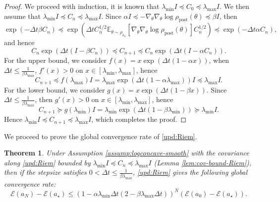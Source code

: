 \documentclass[11pt]{article}
\theoremstyle{plain}
\newtheorem{theorem}{Theorem}[section]
\theoremstyle{definition}
\theoremstyle{remark}
\begin{document}
\begin{proof}
    We proceed with induction, it is known that $\lambda_{\min} I \preceq C_0 \preceq \lambda_{\max} I$. We then assume that $\lambda_{\min} I \preceq C_n \preceq \lambda_{\max} I$.
    Since $\alpha I \preceq -\nabla_\theta \nabla_\theta \log \rho_\mathrm{post} (\theta) \preceq \beta I$, then
    \begin{equation*}
        \exp \left( -\Delta t \beta C_n \right) \preceq \exp \left( \Delta t C_n^{1/2} \mathbb{E}_{\theta\sim \rho_{a_n}} [\nabla_\theta \nabla_\theta \log \rho_\mathrm{post}(\theta)] C_n^{1/2}\right) \preceq \exp \left( -\Delta t \alpha C_n \right),
    \end{equation*}
    and hence
    \begin{equation*}
        C_n \exp \left( \Delta t (I - \beta C_n ) \right) \preceq C_{n+1} \preceq  C_n \exp \left( \Delta t ( I - \alpha C_n) \right).
    \end{equation*}
    For the upper bound, we consider $f(x) = x \exp (\Delta t (1 - \alpha x))$, when $\Delta t \leq \frac{1}{\beta \lambda_{\max}}$, $f'(x) > 0$ on $x \in [\lambda_{\min}, \lambda_{\max}]$, hence
    \begin{equation*}
        C_{n+1} \preceq f(\lambda_{\max}) I = \lambda_{\max} \exp \left(\Delta t (1 - \alpha \lambda_{\max})\right) I \preceq \lambda_{\max} I.
    \end{equation*}
    For the lower bound, we consider $g(x) = x \exp (\Delta t (1 - \beta x))$. Since $\Delta t \leq \frac{1}{\beta \lambda_{\max}}$, then $g'(x) > 0$ on $x \in [\lambda_{\min}, \lambda_{\max}]$, hence
    \begin{equation*}
        C_{n+1} \succeq g(\lambda_{\min}) I = \lambda_{\min} \exp \left( \Delta t (1 - \beta \lambda_{\min}) \right) \succeq \lambda_{\min} I.
    \end{equation*}
    Hence $\lambda_{\min} I \preceq C_{n+1} \preceq \lambda_{\max} I$, which completes the proof.
\end{proof}

We proceed to prove the global convergence rate of \eqref{upd:Riem}.

\begin{theorem}\label{thm:conv-Riem}
    Under Assumption \ref{assump:logconcave-smooth} with the covariance along \eqref{upd:Riem} bounded by $\lambda_{\min} I \preceq C_n \preceq \lambda_{\max} I$ (Lemma \ref{lem:cov-bound-Riem}), then if the stepsize satisfies $0 < \Delta t \leq \frac{1}{\beta \lambda_{\max}}$, \eqref{upd:Riem} gives the following global convergence rate:
    \begin{equation*}
        \mathcal{E}(a_{N}) - \mathcal{E} (a_\star) \leq (1 - \alpha \lambda_{\min} \Delta t (2 - \beta \lambda_{\max} \Delta t))^N (\mathcal{E} (a_0) - \mathcal{E} (a_\star)).
    \end{equation*}
\end{theorem}
\end{document}

